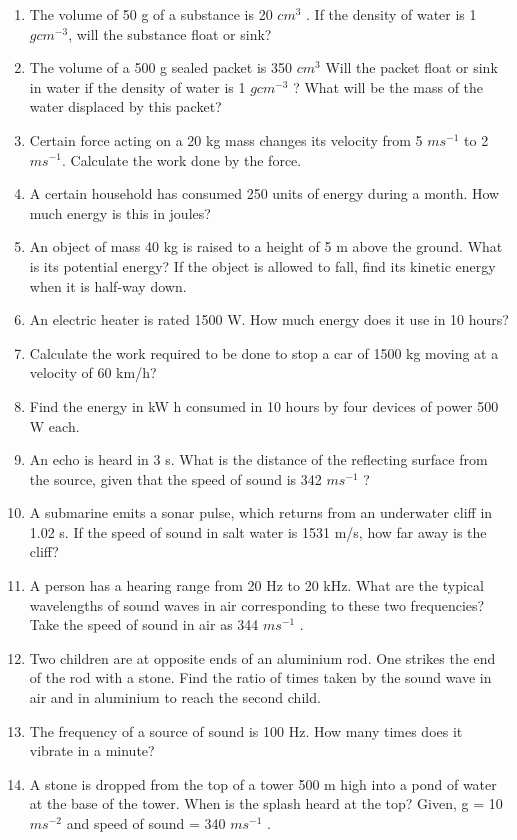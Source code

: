 \begin{enumerate}[label=\arabic*.,ref=\thesubsection.\theenumi]
\item The volume of 50 g of a substance is 20 $cm^3$ 
. If the density of water is 1 $g cm^{-3}$, will the substance float or sink? 
\item  The volume of a 500 g sealed packet is 350 $cm^3$
Will the packet float or sink in water if the density of water is 1 $g cm^{-3}$ ? What will be the mass of the water displaced by this packet?
\item Certain force acting on a 20 kg mass changes its velocity from 5 $m s^{-1}$
to 2 $m s^{-1}$. Calculate the work done by the force.
\item A certain household has consumed 250 units of energy during a month. How much energy is this in joules?
\item  An object of mass 40 kg is raised to a height of 5 m above the ground. What is its potential energy? If the object is allowed to fall, find its kinetic energy when it is half-way down.
\item An electric heater is rated 1500 W. How much energy does it use in 10 hours?
\item Calculate the work required to be done to stop a car of 1500 kg moving at a velocity of 60 km/h?
\item Find the energy in kW h consumed in 10 hours by four devices of power 500 W each.
\item An echo is heard in 3 s. What is the distance of the reflecting surface from the source, given that the speed of sound is 342 $m s^{-1}$
?  
\item A submarine emits a sonar pulse, which returns from an underwater cliff in 1.02 s. If the speed of sound in salt water is 1531 m/s, how far away is the cliff?
\item A person has a hearing range from 20 Hz to 20 kHz. What are the typical wavelengths of sound waves in air corresponding to these two frequencies? Take the speed of sound in air as 344 $m s^{-1}$
.
\item Two children are at opposite ends of an aluminium rod. One strikes the end of the rod with a stone. Find the ratio of times taken by the sound wave in air and in aluminium to reach the second child.
\item  The frequency of a source of sound is 100 Hz. How many times does it vibrate in a minute?
\item A stone is dropped from the top of a tower 500 m high into a pond of water at the base of the tower. When is the splash heard at the top? Given, g = 10 $m s^{-2}$
and speed of sound = 340 $m s^{-1}$ . 

\end{enumerate}
